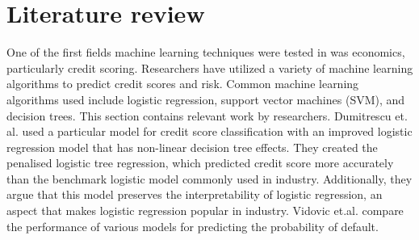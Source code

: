\documentclass{article}
\begin{document}
\section*{Literature review}
One of the first fields machine learning techniques were tested in was economics,
particularly credit scoring. Researchers have utilized a variety of machine learning
algorithms to predict credit scores and risk. Common machine learning algorithms
used include logistic regression, support vector machines (SVM), and decision trees.
This section contains relevant work by researchers.
\vspace{5mm}\newline
Dumitrescu et. al. used a particular model for credit score classification with an 
improved logistic regression model that has non-linear decision tree effects. They created 
the penalised logistic tree regression, which predicted credit score 
more accurately than the benchmark logistic model commonly used in industry.
Additionally, they argue that this model preserves the interpretability of 
logistic regression, an aspect that makes logistic regression popular in industry. 
Vidovic et.al. compare the performance of various models for predicting the probability 
of default. 

\newpage
\end{document}
